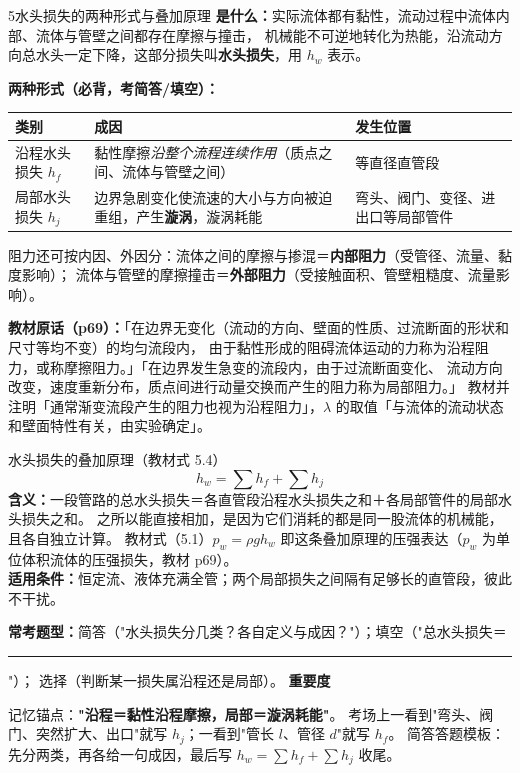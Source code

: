 \begin{kaodian}{5}{水头损失的两种形式与叠加原理}
\textbf{是什么：}实际流体都有黏性，流动过程中流体内部、流体与管壁之间都存在摩擦与撞击，
机械能不可逆地转化为热能，沿流动方向总水头一定下降，这部分损失叫\textbf{水头损失}，用 $h_w$ 表示。

\textbf{两种形式（必背，考简答/填空）：}
\begin{center}
\begin{tabularx}{\textwidth}{@{}lXX@{}}
\toprule
类别 & 成因 & 发生位置 \\
\midrule
沿程水头损失 $h_f$ & 黏性摩擦\emph{沿整个流程连续作用}（质点之间、流体与管壁之间） & 等直径直管段 \\
局部水头损失 $h_j$ & 边界急剧变化使流速的大小与方向被迫重组，产生\textbf{漩涡}，漩涡耗能 & 弯头、阀门、变径、进出口等局部管件 \\
\bottomrule
\end{tabularx}
\end{center}

阻力还可按内因、外因分：流体之间的摩擦与掺混＝\textbf{内部阻力}（受管径、流量、黏度影响）；
流体与管壁的摩擦撞击＝\textbf{外部阻力}（受接触面积、管壁粗糙度、流量影响）。

\noindent\textbf{教材原话（p69）：}「在边界无变化（流动的方向、壁面的性质、过流断面的形状和尺寸等均不变）的均匀流段内，
由于黏性形成的阻碍流体运动的力称为沿程阻力，或称摩擦阻力。」「在边界发生急变的流段内，由于过流断面变化、
流动方向改变，速度重新分布，质点间进行动量交换而产生的阻力称为局部阻力。」
教材并注明「通常渐变流段产生的阻力也视为沿程阻力」，$\lambda$ 的取值「与流体的流动状态和壁面特性有关，由实验确定」。

\begin{gongshi}{水头损失的叠加原理（教材式 5.4）}
\[ h_w=\sum h_f+\sum h_j \]
\textbf{含义：}一段管路的总水头损失＝各直管段沿程水头损失之和＋各局部管件的局部水头损失之和。
之所以能直接相加，是因为它们消耗的都是同一股流体的机械能，且各自独立计算。
教材式（5.1）$p_w=\rho g h_w$ 即这条叠加原理的压强表达（$p_w$ 为单位体积流体的压强损失，教材 p69）。\\
\textbf{适用条件：}恒定流、液体充满全管；两个局部损失之间隔有足够长的直管段，彼此不干扰。
\end{gongshi}

\textbf{常考题型：}简答（"水头损失分几类？各自定义与成因？"）；填空（"总水头损失＝\rule{2cm}{0.4pt}"）；
选择（判断某一损失属沿程还是局部）。
\textbf{重要度 }\quad{}\quad{}

\begin{banfa}
记忆锚点：\textbf{"沿程＝黏性沿程摩擦，局部＝漩涡耗能"}。
考场上一看到"弯头、阀门、突然扩大、出口"就写 $h_j$；一看到"管长 $l$、管径 $d$"就写 $h_f$。
简答答题模板：先分两类，再各给一句成因，最后写 $h_w=\sum h_f+\sum h_j$ 收尾。
\end{banfa}
\end{kaodian}

